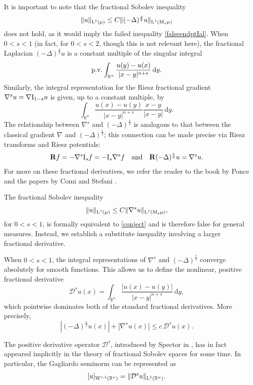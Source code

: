\documentclass[11pt, a4paper, reqno]{amsart}
\newcommand{\R}{\mathbb R}
\newcommand{\D}{\mathcal D}
\newcommand{\Lup}{\textup{L}}
\theoremstyle{definition}
\theoremstyle{remark}
\begin{document}
It is important to note that the fractional Sobolev inequality 
$$ \|u\|_{\Lup^1(\mu)}\leq C\|(-\Delta)^{\frac{s}2}u\|_{\Lup^1(\textup M_s\mu)} $$ 
does not hold, as it would imply the failed inequality \eqref{falseendptIal}. When $0<s<1$ (in fact, for $0<s<2$, though this is not relevant here), the fractional Laplacian $(-\Delta)^{\frac{s}{2}}u$ is a constant multiple of the singular integral 
$$\textup{p.v.}\int_{\R^n}\frac{u(y)-u(x)}{|x-y|^{n+s}}\,\mathrm{d}y. $$ 
Similarly, the integral representation for the Riesz fractional gradient $\nabla^su= \nabla \textup I_{1-s}u$ is given, up to a constant multiple, by
\begin{equation*}
\int_{\R^n}\frac{u(x)-u(y)}{|x-y|^{n+s}}\frac{x-y}{|x-y|}\,\mathrm{d}y.
\end{equation*} 
The relationship between $\nabla^s$ and $(-\Delta)^{\frac{s}{2}}$ is analogous to that between the classical gradient $\nabla$ and $(-\Delta)^{\frac12}$; this connection can be made precise via Riesz transforms and Riesz potentials:
$$\mathbf Rf=-\nabla^s \textup I_{s}f=-\textup{I}_{s}\nabla^s f \quad \text{and} \quad \mathbf R(-\Delta)^{\frac{s}{2}}u=\nabla^s u.$$ 
For more on these fractional derivatives, we refer the reader to the book by Ponce \cite{Ponce} and the papers by Comi and Stefani \cite{CSI,CSII}.

The fractional Sobolev inequality
\[
\|u\|_{\Lup^1(\mu)} \le C \|\nabla^s u\|_{\Lup^1(\textup M_s \mu)},
\]
for $0<s<1$, is formally equivalent to \eqref{conject} and is therefore false for general measures. Instead, we establish a substitute inequality involving a larger fractional derivative.

When $0 < s < 1$, the integral representations of $\nabla^s$ and $(-\Delta)^{\frac{s}{2}}$ converge absolutely for smooth functions. This allows us to define the nonlinear, positive fractional derivative
\[
\D^s u(x) = \int_{\R^n} \frac{|u(x) - u(y)|}{|x-y|^{n+s}}\,\mathrm{d}y,
\]
which pointwise dominates both of the standard fractional derivatives. More precisely,
\begin{equation*}
|(-\Delta)^{\frac{s}{2}}u(x)|+|\nabla^{s}u(x)| \le c\,\D^s u(x).
\end{equation*}

The positive derivative operator $\D^s$, introduced by Spector in \cite{Spector}, has in fact appeared implicitly in the theory of fractional Sobolev spaces for some time. In particular, the Gagliardo seminorm can be represented as
\[
[u]_{\textup W^{s,1}(\R^n)}=\|\D^s u\|_{\Lup^1(\R^n)}.
\]
\end{document}
